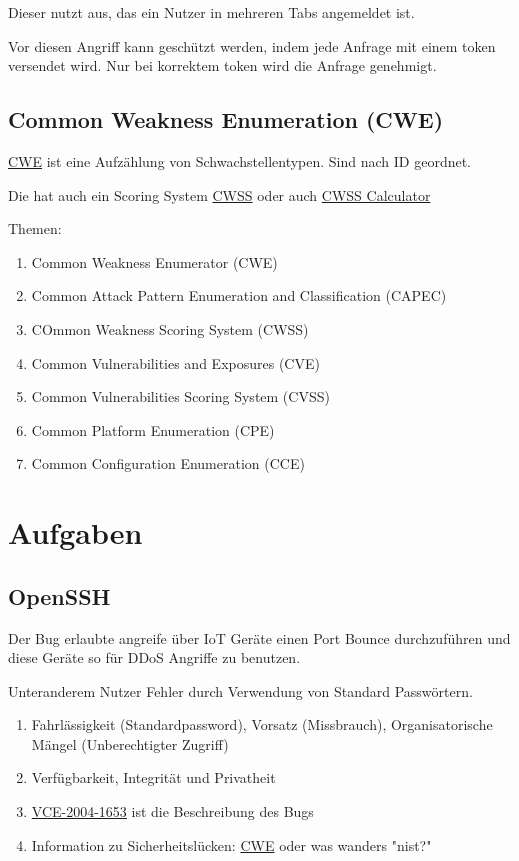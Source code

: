 \documentclass[a4paper]{article}
\begin{document}
Dieser nutzt aus, das ein Nutzer in mehreren Tabs angemeldet ist.

Vor diesen Angriff kann  geschützt werden, indem jede Anfrage mit einem token versendet wird. Nur bei korrektem token wird die Anfrage genehmigt.

\subsection{Common Weakness Enumeration (CWE)}

\href{https://cwe.mitre.org}{CWE} ist eine Aufzählung von Schwachstellentypen. Sind nach ID geordnet.

Die hat auch ein Scoring System \href{https://cwe.mitre.org/cwss}{CWSS} oder auch \href{https://nvd.nist.gov/cvss.cfm}{CWSS Calculator}

Themen:

\begin{enumerate}
    \item Common Weakness Enumerator (CWE)
    \item Common Attack Pattern Enumeration and Classification (CAPEC)
    \item COmmon Weakness Scoring System (CWSS)
    \item Common Vulnerabilities and Exposures (CVE)
    \item Common Vulnerabilities Scoring System (CVSS)
    \item Common Platform Enumeration (CPE)
    \item Common Configuration Enumeration (CCE)
\end{enumerate}

\section{Aufgaben}

\subsection{OpenSSH}

Der Bug erlaubte angreife über IoT Geräte einen Port Bounce durchzuführen und diese Geräte so für DDoS Angriffe zu benutzen.

Unteranderem Nutzer Fehler durch Verwendung von Standard Passwörtern.

\begin{enumerate}
    \item Fahrlässigkeit (Standardpassword), Vorsatz (Missbrauch), Organisatorische Mängel (Unberechtigter Zugriff)
    \item Verfügbarkeit, Integrität und Privatheit
    \item \href{https://nvd.nist.gov/vuln/detail/CVE-2004-1653}{VCE-2004-1653} ist die Beschreibung des Bugs
    \item Information zu Sicherheitslücken: \href{https://cwe.mitre.org}{CWE} oder was wanders "nist?"
\end{enumerate}
\end{document}
